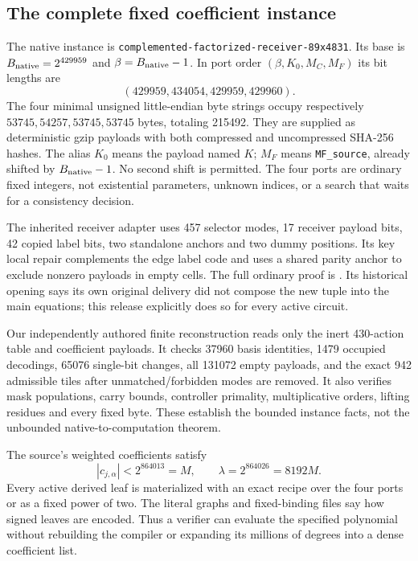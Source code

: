 \subsection{The complete fixed coefficient instance}
The native instance is
\texttt{complemented-factorized-receiver-89x4831}.
Its base is $B_{\rm native}=2^{429959}$ and
$\beta=B_{\rm native}-1$. In port order $(\beta,K_0,M_C,M_F)$ its
bit lengths are
\[
 (429959,434054,429959,429960).
\]
The four minimal unsigned little-endian byte strings occupy respectively
$53745,54257,53745,53745$ bytes, totaling 215492. They are supplied as
deterministic gzip payloads with both compressed and uncompressed SHA-256
hashes. The alias $K_0$ means the payload named $K$; $M_F$ means
\texttt{MF\_source}, already shifted by $B_{\rm native}-1$. No second
shift is permitted. The four ports are ordinary fixed integers, not
existential parameters, unknown indices, or a search that waits for a
consistency decision.

The inherited receiver adapter uses 457 selector modes, 17 receiver
payload bits, 42 copied label bits, two standalone anchors and two dummy
positions. Its key local repair complements the edge label code and uses a
shared parity anchor to exclude nonzero payloads in empty cells. The full
ordinary proof is . Its historical
opening says its own original delivery did not compose the new tuple into
the main equations; this release explicitly does so for every active circuit.

Our independently authored finite reconstruction reads only the inert
430-action table and coefficient payloads. It checks 37960 basis identities,
1479 occupied decodings, 65076 single-bit changes, all 131072 empty payloads,
and the exact 942 admissible tiles after unmatched/forbidden modes are
removed. It also verifies mask populations, carry bounds, controller
primality, multiplicative orders, lifting residues and every fixed byte.
These establish the bounded instance facts, not the unbounded
native-to-computation theorem.

The source's weighted coefficients satisfy
\[
 |c_{j,\alpha}|<2^{864013}=M,\qquad
 \lambda=2^{864026}=8192M.
\]
Every active derived leaf is materialized with an exact recipe over the
four ports or as a fixed power of two. The literal graphs and fixed-binding
files say how signed leaves are encoded. Thus a verifier can evaluate the
specified polynomial without rebuilding the compiler or expanding its
millions of degrees into a dense coefficient list.
